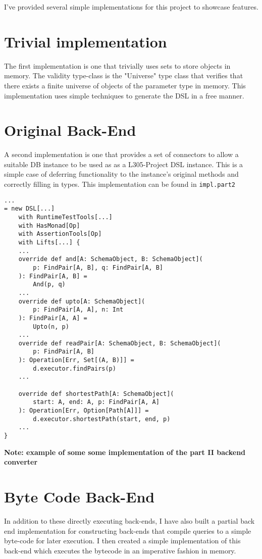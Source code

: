 \documentclass{report}
\newcommand \2[0]{\textbf{2}}
\newcommand \3[0]{\textbf{3}}
\newcommand{\todo}[1]{\textbf{#1}}
\begin{document}
I've provided several simple implementations for this project to showcase features.
\section{Trivial implementation}
The first implementation is one that trivially uses sets  to store objects in memory. The validity type-class is the "Universe" type class that verifies that there exists a finite universe of objects of the parameter type in memory. This implementation uses simple techniques to generate the DSL in a free manner.

\section{Original Back-End}
A second implementation is one that provides a set of connectors to allow a suitable DB instance to be used as as a L305-Project DSL instance. This is a simple case of deferring functionality to the instance's original methods and correctly filling in types.
This implementation can be found in \texttt{impl.part2} 

\begin{verbatim}
...
= new DSL[...]
    with RuntimeTestTools[...]
    with HasMonad[Op]
    with AssertionTools[Op]
    with Lifts[...] {
    ...
    override def and[A: SchemaObject, B: SchemaObject](
        p: FindPair[A, B], q: FindPair[A, B]
    ): FindPair[A, B] =
        And(p, q)
    ...
    override def upto[A: SchemaObject](
        p: FindPair[A, A], n: Int
    ): FindPair[A, A] =
        Upto(n, p)
    ...
    override def readPair[A: SchemaObject, B: SchemaObject](
        p: FindPair[A, B]
    ): Operation[Err, Set[(A, B)]] =
        d.executor.findPairs(p)
    ...
        
    override def shortestPath[A: SchemaObject](
        start: A, end: A, p: FindPair[A, A]
    ): Operation[Err, Option[Path[A]]] =
        d.executor.shortestPath(start, end, p)
    ...
}
\end{verbatim}
\todo{Note: example of some some implementation of the part II backend converter}

\section{Byte Code Back-End}

In addition to these directly executing back-ends, I have also built a partial back end implementation for constructing back-ends that compile queries to a simple byte-code for later execution. I then created a simple implementation of this back-end which executes the bytecode in an imperative fashion in memory.
\end{document}

